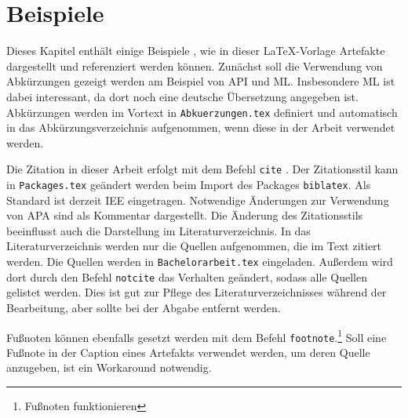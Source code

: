 %
%
\chapter{Beispiele}

Dieses Kapitel enthält einige Beispiele , wie in dieser \LaTeX-Vorlage Artefakte dargestellt und referenziert werden können.
Zunächst soll die Verwendung von Abkürzungen gezeigt werden am Beispiel von \ac{API} und \ac{ML}.
Insbesondere \ac{ML} ist dabei interessant, da dort noch eine deutsche Übersetzung angegeben ist. Abkürzungen werden im Vortext in \texttt{Abkuerzungen.tex} definiert und automatisch in das Abkürzungsverzeichnis aufgenommen, wenn diese in der Arbeit verwendet werden.

Die Zitation in dieser Arbeit erfolgt mit dem Befehl \texttt{cite} \cite[S. 0]{ertelIntroductionArtificialIntelligence2017}.
Der Zitationsstil kann in \texttt{Packages.tex} geändert werden beim Import des Packages \texttt{biblatex}.
Als Standard ist derzeit IEE eingetragen. 
Notwendige Änderungen zur Verwendung von APA sind als Kommentar dargestellt.
Die Änderung des Zitationsstils beeinflusst auch die Darstellung im Literaturverzeichnis.
In das Literaturverzeichnis werden nur die Quellen aufgenommen, die im Text zitiert werden.
Die Quellen werden in \texttt{Bachelorarbeit.tex} eingeladen.
Außerdem wird dort durch den Befehl \texttt{notcite} das Verhalten geändert, sodass alle Quellen gelistet werden.
Dies ist gut zur Pflege des Literaturverzeichnisses während der Bearbeitung, aber sollte bei der Abgabe entfernt werden.

Fußnoten können ebenfalls gesetzt werden mit dem Befehl \texttt{footnote}.\footnote{Fußnoten funktionieren}
Soll eine Fußnote in der Caption eines Artefakts verwendet werden, um deren Quelle anzugeben, ist ein Workaround notwendig.

